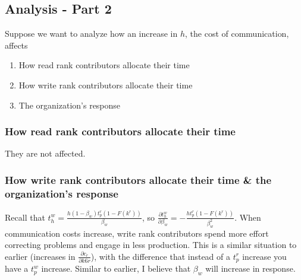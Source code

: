 \documentclass[source/paper/main.tex]{subfiles}
\begin{document}
\subsection{Analysis - Part 2}
Suppose we want to analyze how an increase in $h$, the cost of communication, affects
\begin{enumerate}
    \item How read rank contributors allocate their time
    \item How write rank contributors allocate their time
    \item The organization's response
\end{enumerate}
\subsubsection{How read rank contributors allocate their time}
They are not affected. 
\subsubsection{How write rank contributors allocate their time \& the organization's response}
Recall that $t_h^w = \frac{ h (1-\beta_w) t_p^r(1-F(k^r))}{\beta_w}$, so $\frac{\partial t_h^w}{\partial \beta_w} = -\frac{h t_p^r(1-F(k^r))}{\beta_w^2}$. 
When communication costs increase, write rank contributors spend more effort correcting problems and engage in less production. This is a similar situation to earlier (increases in $\frac{\partial c_r}{\partial k6r}$), with the difference that instead of a $t_p^r$ increase you have a $t_p^w$ increase. Similar to earlier, I believe that $\beta_w$ will increase in response. 
\end{document}
